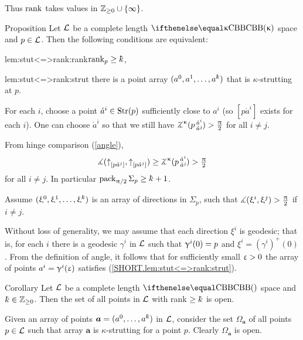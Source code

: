 Thus $\mathop{\rm rank}\nolimits$ takes values in $\ZZ_{\ge0}\cup\{\infty\}$.


\begin{thm}{Proposition}\label{prop:stutt}
Let $\mathcal{L}$ be a complete length $\Alex{\kappa}$ space 
and $p\in \spc{L}$.
Then the following conditions are equivalent:

\begin{subthm}{lem:stut<=>rank:rank}$\rank_p\ge\kay$,
\end{subthm}

\begin{subthm}{lem:stut<=>rank:strut}
there is a  point array $(a^0,a^1,\dots,a^\kay)$
that is $\kappa$-strutting at $p$. 
\end{subthm}
\end{thm}

For each $i$,
choose a point $\acute a^i\in\Str(p)$ sufficiently close to $a^i$ (so $[p\acute a^i]$ exists for each $i$).
One can choose $\acute a^i$ so that we still have
$\angk\kappa{p}{\acute a^i}{\acute a^j}>\tfrac\pi2$ for all $i\not=j$.

From hinge comparison (\ref{angle}),
\[\mangle(\dir{p}{\acute a^j},\dir{p}{\acute a^j})
\ge
\angk\kappa{p}{\acute a^i}{\acute a^j}
>
\tfrac\pi2\]
for all $i\not=j$.
In particular $\pack_{\pi/2}\Sigma_p\ge \kay+1$.

Assume $(\xi^0,\xi^1,\dots,\xi^\kay)$ is an array of directions in $\Sigma_p$, such that $\measuredangle(\upxi^i,\upxi^j)>\tfrac{\uppi}2$ if $i\not=j$.

Without loss of generality, 
we may assume that each direction $\xi^i$ is geodesic;
that is, for each $i$ there is a geodesic $\gamma^i$ in $\mathcal{L}$ such that $\gamma^i(0)\z=p$ and $\xi^i=(\gamma^i)^+(0)$.
From the definition of angle, it follows that for sufficiently small $\upvarepsilon>0$ the array of points $a^i=\upgamma^i(\upvarepsilon)$ satisfies (\ref{SHORT.lem:stut<=>rank:strut}).
\qeds

\begin{thm}{Corollary}\label{cor:rank>=k-open}
Let $\mathcal{L}$ be a complete length $\Alex{}$ space and $\kay\in\ZZ_{\ge0}$.
Then the set of all points in $\mathcal{L}$ 
with rank $\ge \kay$ is open.
\end{thm}

 Given an array of points $\bm{a}=(a^0,\dots,a^\kay)$ in $\mathcal{L}$, consider 
the set $\Omega_{\bm{a}}$ of all points $p\in \spc{L}$ such that array $\bm{a}$
 is $\kappa$-strutting for a point $p$.
Clearly $\Omega_{\bm{a}}$ is open.

